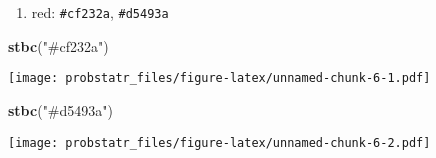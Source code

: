 \documentclass[]{ctexbook}
\newenvironment{Shaded}{\begin{snugshade}}{\end{snugshade}}
\newcommand{\KeywordTok}[1]{\textcolor[rgb]{0.13,0.29,0.53}{\textbf{#1}}}
\newcommand{\NormalTok}[1]{#1}
\newcommand{\StringTok}[1]{\textcolor[rgb]{0.31,0.60,0.02}{#1}}
\providecommand{\tightlist}{%
  \setlength{\itemsep}{0pt}\setlength{\parskip}{0pt}}
\begin{document}
\begin{enumerate}
\def\labelenumi{\arabic{enumi}.}
\setcounter{enumi}{4}
\tightlist
\item
  red: \texttt{\#cf232a}, \texttt{\#d5493a}
\end{enumerate}

\begin{Shaded}
\begin{Highlighting}[]
\KeywordTok{stbc}\NormalTok{(}\StringTok{"#cf232a"}\NormalTok{)}
\end{Highlighting}
\end{Shaded}

\texttt{[image: probstatr\_files/figure-latex/unnamed-chunk-6-1.pdf]}

\begin{Shaded}
\begin{Highlighting}[]
\KeywordTok{stbc}\NormalTok{(}\StringTok{"#d5493a"}\NormalTok{)}
\end{Highlighting}
\end{Shaded}

\texttt{[image: probstatr\_files/figure-latex/unnamed-chunk-6-2.pdf]}



\backmatter
\printindex
\end{document}
